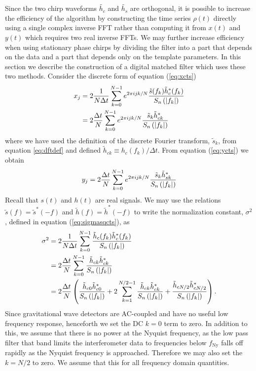 Since the two chirp waveforms $\tilde{h_c}$ and $\tilde{h_s}$ are 
orthogonal, it is possible to increase the efficiency of the algorithm by
constructing the time series $\rho(t)$ directly using a single complex inverse
FFT rather than computing it from $x(t)$ and $y(t)$ which requires two real
inverse FFTs. We may further increase efficiency when using stationary phase
chirps by dividing the filter into a part that depends on the data and a part
that depends only on the template parameters. In this section we describe the
construction of a digital matched filter which uses these two methods.
Consider the discrete form of equation (\ref{eq:xcts})
\begin{equation}
\begin{split}
\label{eq:xdisc}
x_j &= 2 \frac{1}{N\Delta t} \sum_{k=0}^{N-1} e^{2\pi ijk/N} 
\frac{\tilde{s}(f_k) \tilde{h}_{c}^\ast(f_k)}{S_n\left(\left|f_{k}\right|\right)} \\
&=
2 \frac{\Delta t}{N} \sum_{k=0}^{N-1} e^{2\pi ijk/N} 
\frac{\tilde{s}_k \tilde{h}_{ck}^\ast} {S_n\left(\left|f_{k}\right|\right)}
\end{split}
\end{equation}
where we have used the definition of the discrete Fourier transform,
$\tilde{s}_k$, from equation \ref{eq:dftdef} and defined 
$\tilde{h}_{ck} \equiv {h}_c(f_k) / \Delta t$. From equation
(\ref{eq:ycts}) we obtain
\begin{equation}
\label{eq:ydisc}
y_j = 2 \frac{\Delta t}{N} \sum_{k=0}^{N-1} e^{2\pi ijk/N} 
\frac{\tilde{s}_k \tilde{h}_{sk}^\ast} {S_n\left(\left|f_{k}\right|\right)}
\end{equation}
Recall that $s(t)$ and $h(t)$ are real signals. We may use the relations
$\tilde{s}(f) = \tilde{s}^\ast(-f)$ and $\tilde{h}(f) = \tilde{h}^\ast(-f)$ to
write the normalization constant, $\sigma^2$, defined in equation
(\ref{eq:sigmasqcts}), as
\begin{equation}
\begin{split}
\label{eq:sigmasqdisc}
\sigma^2 &= 2 \frac{1}{N\Delta t} \sum_{k=0}^{N-1}
\frac{\tilde{h}_{c}(f_k)\tilde{h}_{c}^\ast(f_k)}{S_n\left(\left|f_{k}\right|\right)}  \\
&=
2 \frac{\Delta t}{N} \sum_{k=0}^{N-1}
\frac{\tilde{h}_{ck}\tilde{h}_{ck}^\ast}{S_n\left(\left|f_{k}\right|\right)} \\
&=
2 \frac{\Delta t}{N} \left( 
\frac{\tilde{h}_{c0}\tilde{h}_{c0}^\ast}{S_n\left(\left|f_{k}\right|\right)} 
+
2 \sum_{k=1}^{N/2-1}
\frac{\tilde{h}_{ck}\tilde{h}_{ck}^\ast}{S_n\left(\left|f_{k}\right|\right)}
+
\frac{\tilde{h}_{cN/2}\tilde{h}_{cN/2}^\ast}{S_n\left(\left|f_{k}\right|\right)} 
\right).
\end{split}
\end{equation}
Since gravitational wave detectors are AC-coupled and have no useful low
frequency response, henceforth we set the DC $k=0$ term to zero. In addition
to this, we assume that there is no power at the Nyquist frequency, as the
low pass filter that band limits the interferometer data to frequencies below
$f_\mathrm{Ny}$ falls off rapidly as the Nyquist frequency is approached.
Therefore we may also set the $k=N/2$ to zero. We assume that this for all
frequency domain quantities.


